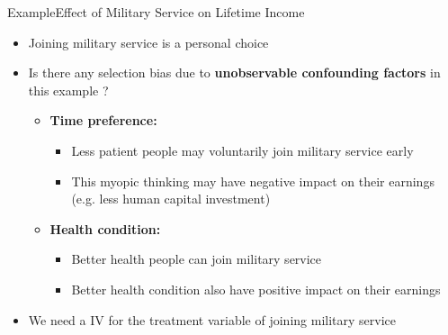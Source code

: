 \documentclass[dvipsnames,hyperref={pdfpagelabels=false}]{beamer}
\begin{document}
\begin{frame}{Example}{Effect of Military Service on Lifetime Income}
	\begin{itemize}
		\item Joining military service is a personal choice
		\vspace{0.2cm}
		\item Is there any selection bias due to \textbf{unobservable confounding factors} in this example ?
		\vspace{0.2cm}
		\begin{itemize}
			\item \textbf{Time preference:} 
			\begin{itemize}	
				\vspace{0.2cm}
				\item Less patient people may voluntarily join military service early
				\vspace{0.2cm}
				\item This myopic thinking may have negative impact on their earnings (e.g. less human capital investment) 
				\vspace{0.2cm} 
			\end{itemize}	
			\item \textbf{Health condition:} 
			\vspace{0.2cm} 
			\begin{itemize}	
				\item Better health people can join military service 
				\vspace{0.2cm} 
				\item Better health condition also have positive impact on their earnings
			\end{itemize}			
		\end{itemize}
		\vspace{0.2cm} 
		\item We need a IV for the treatment variable of joining military service
		
	\end{itemize}
\end{frame}
\end{document}
